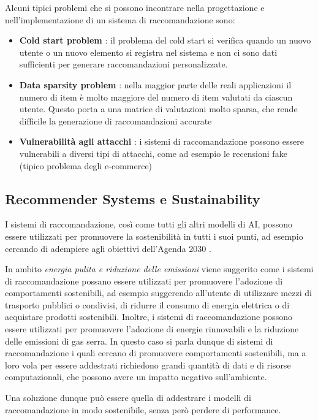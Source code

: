\noindent Alcuni tipici problemi che si possono incontrare nella progettazione e nell'implementazione di un sistema di raccomandazione sono:
\begin{itemize}
    \item \textbf{Cold start problem} \cite{ColdStart}: il problema del cold start si verifica quando un nuovo utente o un nuovo elemento si registra nel sistema e non ci sono dati sufficienti per generare raccomandazioni personalizzate.
    \item \textbf{Data sparsity problem} \cite{DataSparsity}: nella maggior parte delle reali applicazioni il numero di item è molto maggiore del numero di item valutati da ciascun utente. Questo porta a una matrice di valutazioni molto sparsa, che rende difficile la generazione di raccomandazioni accurate
    \item \textbf{Vulnerabilità agli attacchi} \cite{Attacchi} : i sistemi di raccomandazione possono essere vulnerabili a diversi tipi di attacchi, come ad esempio le recensioni fake (tipico problema degli e-commerce)
\end{itemize}

\subsection{Recommender Systems e Sustainability}

I sistemi di raccomandazione, così come tutti gli altri modelli di AI, possono essere utilizzati per promuovere la sostenibilità in tutti i suoi punti, ad esempio cercando di adempiere agli obiettivi dell'Agenda 2030 \cite{RecommenderSustainability}.

\noindent In ambito \textit{energia pulita e riduzione delle emissioni} viene suggerito come i sistemi di raccomandazione possano essere utilizzati per promuovere l'adozione di comportamenti sostenibili, ad esempio suggerendo all'utente di utilizzare mezzi di trasporto pubblici o condivisi, di ridurre il consumo di energia elettrica o di acquistare prodotti sostenibili. Inoltre, i sistemi di raccomandazione possono essere utilizzati per promuovere l'adozione di energie rinnovabili e la riduzione delle emissioni di gas serra. In questo caso si parla dunque di sistemi di raccomandazione i quali cercano di promuovere comportamenti sostenibili, ma a loro vola per essere addestrati richiedono grandi quantità di dati e di risorse computazionali, che possono avere un impatto negativo sull'ambiente.

\noindent Una soluzione dunque può essere quella di addestrare i modelli di raccomandazione in modo sostenibile, senza però perdere di performance.

